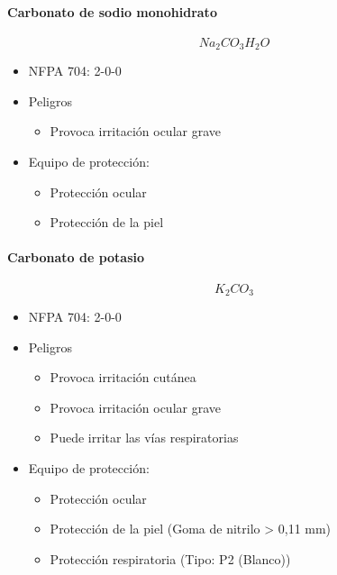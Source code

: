 \paragraph{Carbonato de sodio monohidrato} \textit{$$Na_2CO_3 H_2O$$} \cite{na2co3h2o}
\begin{itemize}
    \item NFPA 704: 2-0-0 \cite{nfpa704}
    \item Peligros
    \begin{itemize}
        \item Provoca irritación ocular grave
    \end{itemize}
    \item Equipo de protección: 
    \begin{itemize}
        \item Protección ocular
        \item Protección de la piel
    \end{itemize}
\end{itemize}

\paragraph{Carbonato de potasio} \textit{$$K_2CO_3$$} \cite{k2co3}
\begin{itemize}
    \item NFPA 704: 2-0-0 \cite{nfpa704}
    \item Peligros
    \begin{itemize}
        \item Provoca irritación cutánea
        \item Provoca irritación ocular grave
        \item Puede irritar las vías respiratorias
    \end{itemize}
    \item Equipo de protección: 
    \begin{itemize}
        \item Protección ocular
        \item Protección de la piel (Goma de nitrilo > 0,11 mm)
        \item Protección respiratoria (Tipo: P2 \cite{abek} (Blanco))
    \end{itemize}
\end{itemize}

